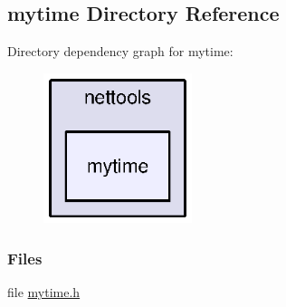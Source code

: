 \subsection{mytime Directory Reference}
\label{dir_9195fb3778477ca4003b0c7d2a76ed27}
Directory dependency graph for mytime\+:
\nopagebreak
\begin{figure}[H]
\begin{center}
\leavevmode
\includegraphics[width=123pt]{dir_9195fb3778477ca4003b0c7d2a76ed27_dep}
\end{center}
\end{figure}
\subsubsection*{Files}
\begin{DoxyCompactItemize}
\item 
file \hyperlink{mytime_8h}{mytime.\+h}
\end{DoxyCompactItemize}

